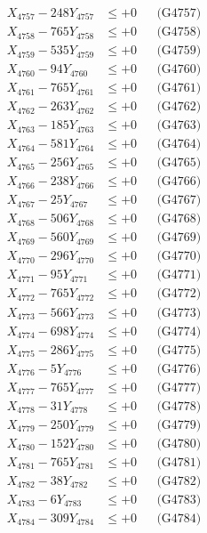 \documentclass[a4paper,10pt]{article}
\begin{document}
{\begin{align}
X_{4757} - 248Y_{4757} &\leq +0 && \text{(G4757)} \\
X_{4758} - 765Y_{4758} &\leq +0 && \text{(G4758)} \\
X_{4759} - 535Y_{4759} &\leq +0 && \text{(G4759)} \\
X_{4760} - 94Y_{4760} &\leq +0 && \text{(G4760)} \\
\allowbreak
X_{4761} - 765Y_{4761} &\leq +0 && \text{(G4761)} \\
X_{4762} - 263Y_{4762} &\leq +0 && \text{(G4762)} \\
X_{4763} - 185Y_{4763} &\leq +0 && \text{(G4763)} \\
X_{4764} - 581Y_{4764} &\leq +0 && \text{(G4764)} \\
X_{4765} - 256Y_{4765} &\leq +0 && \text{(G4765)} \\
X_{4766} - 238Y_{4766} &\leq +0 && \text{(G4766)} \\
X_{4767} - 25Y_{4767} &\leq +0 && \text{(G4767)} \\
X_{4768} - 506Y_{4768} &\leq +0 && \text{(G4768)} \\
X_{4769} - 560Y_{4769} &\leq +0 && \text{(G4769)} \\
X_{4770} - 296Y_{4770} &\leq +0 && \text{(G4770)} \\
\allowbreak
X_{4771} - 95Y_{4771} &\leq +0 && \text{(G4771)} \\
X_{4772} - 765Y_{4772} &\leq +0 && \text{(G4772)} \\
X_{4773} - 566Y_{4773} &\leq +0 && \text{(G4773)} \\
X_{4774} - 698Y_{4774} &\leq +0 && \text{(G4774)} \\
X_{4775} - 286Y_{4775} &\leq +0 && \text{(G4775)} \\
X_{4776} - 5Y_{4776} &\leq +0 && \text{(G4776)} \\
X_{4777} - 765Y_{4777} &\leq +0 && \text{(G4777)} \\
X_{4778} - 31Y_{4778} &\leq +0 && \text{(G4778)} \\
X_{4779} - 250Y_{4779} &\leq +0 && \text{(G4779)} \\
X_{4780} - 152Y_{4780} &\leq +0 && \text{(G4780)} \\
\allowbreak
X_{4781} - 765Y_{4781} &\leq +0 && \text{(G4781)} \\
X_{4782} - 38Y_{4782} &\leq +0 && \text{(G4782)} \\
X_{4783} - 6Y_{4783} &\leq +0 && \text{(G4783)} \\
X_{4784} - 309Y_{4784} &\leq +0 && \text{(G4784)} \\

\end{align}}
\end{document}
